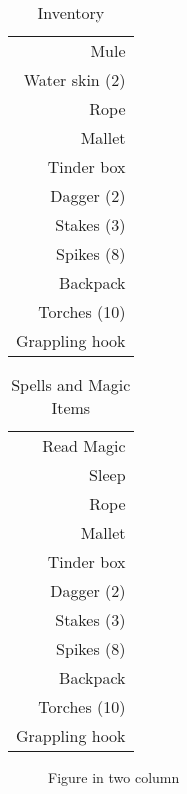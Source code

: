 \documentclass[a4paper]{article}
\begin{document}
\begin{multicols}{2}
\begin{table}[H]
\begin{center}
    \caption*{Inventory}
    \begin{tabular}{r} %
      Mule\\
      Water skin (2)\\
      Rope\\
      Mallet\\
      Tinder box\\
      Dagger (2)\\
      Stakes (3)\\
      Spikes (8)\\
      Backpack\\
      Torches (10)\\
      Grappling hook\\
    \end{tabular}
  \end{center}
\end{table}
\begin{table}[H]
  \begin{center}
    \caption*{Spells and Magic Items}
    \begin{tabular}{r} %
      Read Magic\\
      Sleep\\
      Rope\\
      Mallet\\
      Tinder box\\
      Dagger (2)\\
      Stakes (3)\\
      Spikes (8)\\
      Backpack\\
      Torches (10)\\
      Grappling hook\\
    \end{tabular}
  \end{center}
\end{table}
\begin{figure}[H]
  \centering
  \caption{Figure in two column}
\end{figure}
\end{multicols}
\end{document}
